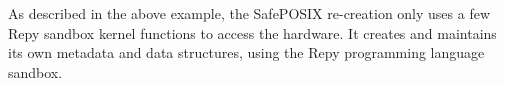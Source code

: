
As described in the above example, the SafePOSIX re-creation only uses a few Repy sandbox kernel functions to access the hardware.
It creates and maintains its own metadata and data structures, using the Repy programming language sandbox.

